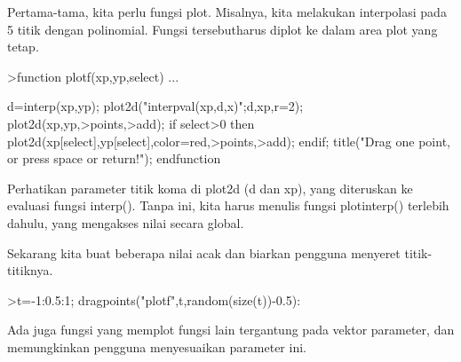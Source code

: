 \documentclass[a4paper,10pt]{article}
\begin{document}
\begin{eulernotebook}
\begin{eulercomment}
\begin{eulercomment}
\begin{eulercomment}
\begin{eulercomment}
\begin{eulercomment}
\begin{eulercomment}
\begin{eulercomment}
\begin{eulercomment}
\begin{eulercomment}
\begin{eulercomment}
\begin{eulercomment}
Pertama-tama, kita perlu fungsi plot. Misalnya, kita melakukan
interpolasi pada 5 titik dengan polinomial. Fungsi tersebutharus
diplot ke dalam area plot yang tetap.
\end{eulercomment}
\begin{eulerprompt}
>function plotf(xp,yp,select) ...
\end{eulerprompt}
\begin{eulerudf}
    d=interp(xp,yp);
    plot2d("interpval(xp,d,x)";d,xp,r=2);
    plot2d(xp,yp,>points,>add);
    if select>0 then
      plot2d(xp[select],yp[select],color=red,>points,>add);
    endif;
    title("Drag one point, or press space or return!");
  endfunction
\end{eulerudf}
\begin{eulercomment}
Perhatikan parameter titik koma di plot2d (d dan xp), yang diteruskan
ke evaluasi fungsi interp(). Tanpa ini, kita harus menulis fungsi
plotinterp() terlebih dahulu, yang mengakses nilai secara global.

Sekarang kita buat beberapa nilai acak dan biarkan pengguna menyeret
titik-titiknya.
\end{eulercomment}
\begin{eulerprompt}
>t=-1:0.5:1; dragpoints("plotf",t,random(size(t))-0.5):
\end{eulerprompt}
\begin{eulercomment}
Ada juga fungsi yang memplot fungsi lain tergantung pada vektor
parameter, dan memungkinkan pengguna menyesuaikan parameter ini.


\end{eulercomment}
\end{eulercomment}
\end{eulercomment}
\end{eulercomment}
\end{eulercomment}
\end{eulercomment}
\end{eulercomment}
\end{eulercomment}
\end{eulercomment}
\end{eulercomment}
\end{eulercomment}
\end{eulernotebook}
\end{document}
